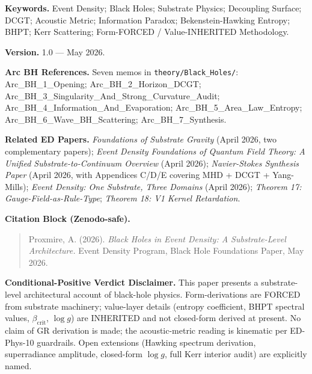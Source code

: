\documentclass[
  11pt,
  a4paper,
]{article}
\begin{document}
\textbf{Keywords.} Event Density; Black Holes; Substrate Physics;
Decoupling Surface; DCGT; Acoustic Metric; Information Paradox;
Bekenstein-Hawking Entropy; BHPT; Kerr Scattering; Form-FORCED /
Value-INHERITED Methodology.

\textbf{Version.} 1.0 --- May 2026.

\textbf{Arc BH References.} Seven memos in
\texttt{theory/Black\_Holes/}: Arc\_BH\_1\_Opening;
Arc\_BH\_2\_Horizon\_DCGT;
Arc\_BH\_3\_Singularity\_And\_Strong\_Curvature\_Audit;
Arc\_BH\_4\_Information\_And\_Evaporation;
Arc\_BH\_5\_Area\_Law\_Entropy; Arc\_BH\_6\_Wave\_BH\_Scattering;
Arc\_BH\_7\_Synthesis.

\textbf{Related ED Papers.} \emph{Foundations of Substrate Gravity}
(April 2026, two complementary papers); \emph{Event Density Foundations
of Quantum Field Theory: A Unified Substrate-to-Continuum Overview}
(April 2026); \emph{Navier-Stokes Synthesis Paper} (April 2026, with
Appendices C/D/E covering MHD + DCGT + Yang-Mills); \emph{Event Density:
One Substrate, Three Domains} (April 2026); \emph{Theorem 17:
Gauge-Field-as-Rule-Type}; \emph{Theorem 18: V1 Kernel Retardation}.

\textbf{Citation Block (Zenodo-safe).}

\begin{quote}
Proxmire, A. (2026). \emph{Black Holes in Event Density: A
Substrate-Level Architecture.} Event Density Program, Black Hole
Foundations Paper, May 2026.
\end{quote}

\textbf{Conditional-Positive Verdict Disclaimer.} This paper presents a
substrate-level architectural account of black-hole physics.
Form-derivations are FORCED from substrate machinery; value-layer
details (entropy coefficient, BHPT spectral values,
\(\beta_\mathrm{crit}\), \(\log g\)) are INHERITED and not closed-form
derived at present. No claim of GR derivation is made; the
acoustic-metric reading is kinematic per ED-Phys-10 guardrails. Open
extensions (Hawking spectrum derivation, superradiance amplitude,
closed-form \(\log g\), full Kerr interior audit) are explicitly named.
\end{document}
